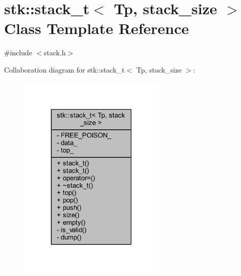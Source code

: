 \hypertarget{classstk_1_1stack__t}{}\section{stk\+:\+:stack\+\_\+t$<$ Tp, stack\+\_\+size $>$ Class Template Reference}
\label{classstk_1_1stack__t}


{\ttfamily \#include $<$stack.\+h$>$}



Collaboration diagram for stk\+:\+:stack\+\_\+t$<$ Tp, stack\+\_\+size $>$\+:
\nopagebreak
\begin{figure}[H]
\begin{center}
\leavevmode
\includegraphics[width=198pt]{classstk_1_1stack__t__coll__graph}
\end{center}
\end{figure}
